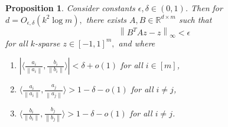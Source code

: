 \documentclass[10pt,a4paper]{amsart}
\newtheorem{proposition}{Proposition}
\newcommand{\RR}{\mathbb{R}}
\newcommand{\norm}[1]{\left\|#1\right\|}
\begin{document}
\begin{proposition}\label{prop:geometry-1}
    Consider constants $\epsilon, \delta\in (0,1)$. Then for $d = O_{\epsilon,\delta}(k^2\log m),$ there exists $A,B\in \RR^{d\times m}$ such that
    \begin{equation}
        \norm{B^TAz - z}_\infty < \epsilon
    \end{equation}
    for all $k$-sparse $z\in [-1,1]^m,$ and where
    \begin{enumerate}
        \item[(i)] $|\langle \frac{a_i}{\norm{a_i}}, \frac{b_i}{\norm{b_i}}\rangle| < \delta + o(1)$ for all $i\in [m]$,
        \item[(ii)] $\langle \frac{a_i}{\norm{a_i}}, \frac{a_j}{\norm{a_j}}\rangle
        > 1 - \delta - o(1)$ for all $i\neq j$,
        \item[(iii)] $\langle \frac{b_i}{\norm{b_i}}, \frac{b_j}{\norm{b_j}}\rangle > 1 - \delta - o(1)$ for all $i\neq j$.
    \end{enumerate}
\end{proposition}
\end{document}
